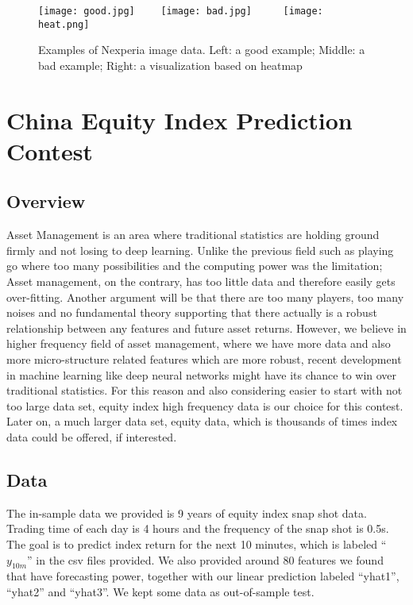 \documentclass[11pt]{article}
\begin{document}
\begin{figure}[htbp]
\begin{centering}
	\texttt{[image: good.jpg]}  \ \  \ \
	\texttt{[image: bad.jpg]}  \ \ \ \ \
	\texttt{[image: heat.png]}  
	\caption{Examples of Nexperia image data. Left: a good example; Middle: a bad example; Right: a visualization based on heatmap}
	\label{fig:nexperia}
	\end{centering}
\end{figure}

\section{China Equity Index Prediction Contest}
\subsection{Overview}
Asset Management is an area where traditional statistics are holding ground firmly and not losing to deep learning. Unlike the previous field such as playing go where too many possibilities and the computing power was the limitation; Asset management, on the contrary, has too little data and therefore easily gets over-fitting. Another argument will be that there are too many players, too many noises and no fundamental theory supporting that there actually is a robust relationship between any features and future asset returns. However, we believe in higher frequency field of asset management, where we have more data and also more micro-structure related features which are more robust, recent development in machine learning like deep neural networks might have its chance to win over traditional statistics. 
For this reason and also considering easier to start with not too large data set, equity index high frequency data is our choice for this contest. Later on, a much larger data set, equity data, which is thousands of times index data could be offered, if interested. 

\subsection{Data}
The in-sample data we provided is 9 years of equity index snap shot data.  Trading time of each day is 4 hours and the frequency of the snap shot is 0.5s. The goal is to predict index return for the next 10 minutes, which is labeled “$y_{10m}$” in the csv files provided. We also provided around 80 features we found that have forecasting power, together with our linear prediction labeled “yhat1”, “yhat2” and “yhat3”. We kept some data as out-of-sample test. 
\end{document}
